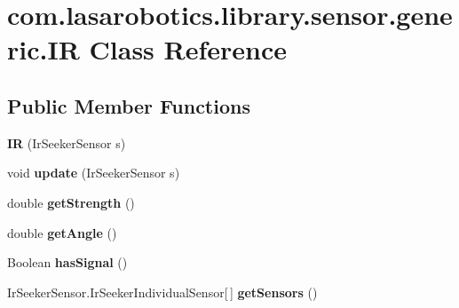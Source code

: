 \hypertarget{classcom_1_1lasarobotics_1_1library_1_1sensor_1_1generic_1_1_i_r}{}\section{com.\+lasarobotics.\+library.\+sensor.\+generic.\+I\+R Class Reference}
\label{classcom_1_1lasarobotics_1_1library_1_1sensor_1_1generic_1_1_i_r}
\subsection*{Public Member Functions}
\begin{DoxyCompactItemize}
\item 
\hypertarget{classcom_1_1lasarobotics_1_1library_1_1sensor_1_1generic_1_1_i_r_a790d87d212b4a8e4ccce073018058a5d}{}{\bfseries I\+R} (Ir\+Seeker\+Sensor s)\label{classcom_1_1lasarobotics_1_1library_1_1sensor_1_1generic_1_1_i_r_a790d87d212b4a8e4ccce073018058a5d}

\item 
\hypertarget{classcom_1_1lasarobotics_1_1library_1_1sensor_1_1generic_1_1_i_r_a2ccce550b8d9194a819944f2202f4dba}{}void {\bfseries update} (Ir\+Seeker\+Sensor s)\label{classcom_1_1lasarobotics_1_1library_1_1sensor_1_1generic_1_1_i_r_a2ccce550b8d9194a819944f2202f4dba}

\item 
\hypertarget{classcom_1_1lasarobotics_1_1library_1_1sensor_1_1generic_1_1_i_r_acfc4b6158c48373d3476c6a02173f434}{}double {\bfseries get\+Strength} ()\label{classcom_1_1lasarobotics_1_1library_1_1sensor_1_1generic_1_1_i_r_acfc4b6158c48373d3476c6a02173f434}

\item 
\hypertarget{classcom_1_1lasarobotics_1_1library_1_1sensor_1_1generic_1_1_i_r_a686b1e4973ef3584ef6955987042e620}{}double {\bfseries get\+Angle} ()\label{classcom_1_1lasarobotics_1_1library_1_1sensor_1_1generic_1_1_i_r_a686b1e4973ef3584ef6955987042e620}

\item 
\hypertarget{classcom_1_1lasarobotics_1_1library_1_1sensor_1_1generic_1_1_i_r_ac74388ffe84f8c120965ddcd9a005b3f}{}Boolean {\bfseries has\+Signal} ()\label{classcom_1_1lasarobotics_1_1library_1_1sensor_1_1generic_1_1_i_r_ac74388ffe84f8c120965ddcd9a005b3f}

\item 
\hypertarget{classcom_1_1lasarobotics_1_1library_1_1sensor_1_1generic_1_1_i_r_ac7c59f54b507c544b404ea78b66a940e}{}Ir\+Seeker\+Sensor.\+Ir\+Seeker\+Individual\+Sensor\mbox{[}$\,$\mbox{]} {\bfseries get\+Sensors} ()\label{classcom_1_1lasarobotics_1_1library_1_1sensor_1_1generic_1_1_i_r_ac7c59f54b507c544b404ea78b66a940e}

\end{DoxyCompactItemize}


